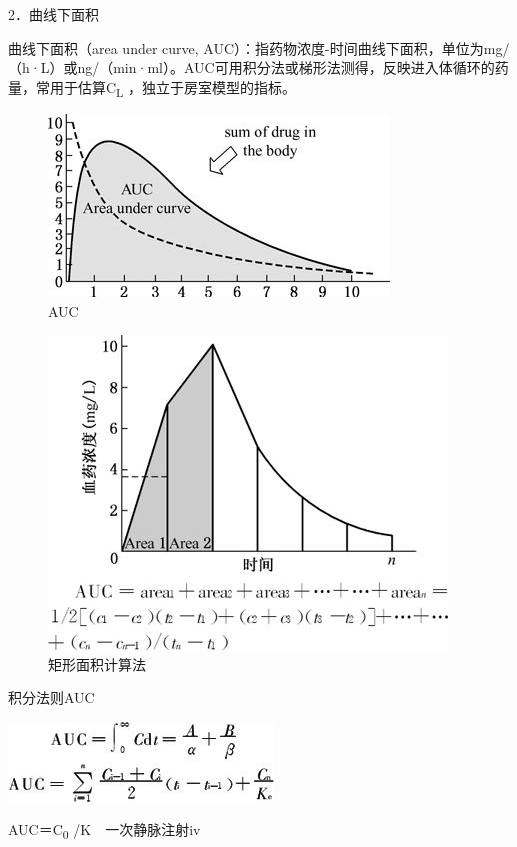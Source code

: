 2．曲线下面积

曲线下面积（area under curve,
AUC）：指药物浓度-时间曲线下面积，单位为mg/（h·L）或ng/（min·ml）。AUC可用积分法或梯形法测得，反映进入体循环的药量，常用于估算C\textsubscript{L}
，独立于房室模型的指标。

\begin{figure}[!htbp]
 \centering
 \includegraphics{./images/Image00058.jpg}
 \captionsetup{justification=centering}
 \caption{AUC}
 \label{fig3-19}
  \end{figure} 

\begin{figure}[!htbp]
 \centering
 \includegraphics{./images/Image00059.jpg}
 \captionsetup{justification=centering}
 \caption{矩形面积计算法}
 \label{fig3-20}
  \end{figure} 

积分法则AUC

\includegraphics{./images/Image00060.jpg}

AUC＝C\textsubscript{0} /K　一次静脉注射iv

